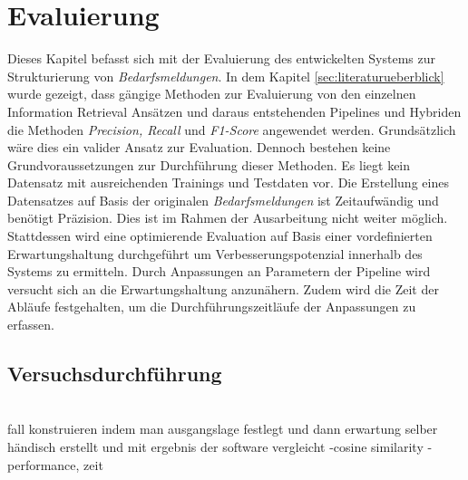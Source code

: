 \chapter{Evaluierung}
\label{chap:evaluation}
Dieses Kapitel befasst sich mit der Evaluierung des entwickelten Systems zur Strukturierung von \emph{Bedarfsmeldungen}. In dem Kapitel \ref{sec:literaturueberblick} wurde gezeigt, dass gängige Methoden zur Evaluierung von den einzelnen Information Retrieval Ansätzen und daraus entstehenden Pipelines und Hybriden die Methoden \emph{Precision, Recall} und \emph{F1-Score} angewendet werden. Grundsätzlich wäre dies ein valider Ansatz zur Evaluation. Dennoch bestehen keine Grundvoraussetzungen zur Durchführung dieser Methoden. Es liegt kein Datensatz mit ausreichenden Trainings und Testdaten vor. Die Erstellung eines Datensatzes auf Basis der originalen \emph{Bedarfsmeldungen} ist Zeitaufwändig und benötigt Präzision. Dies ist im Rahmen der Ausarbeitung nicht weiter möglich. Stattdessen wird eine optimierende Evaluation auf Basis einer vordefinierten Erwartungshaltung durchgeführt um Verbesserungspotenzial innerhalb des Systems zu ermitteln. Durch Anpassungen an Parametern der Pipeline wird versucht sich an die Erwartungshaltung anzunähern. Zudem wird die Zeit der Abläufe festgehalten, um die Durchführungszeitläufe der Anpassungen zu erfassen.






\section{Versuchsdurchführung}
\\
fall konstruieren indem man ausgangslage festlegt und dann erwartung selber händisch erstellt und mit ergebnis der software vergleicht
-cosine similarity
-performance, zeit
